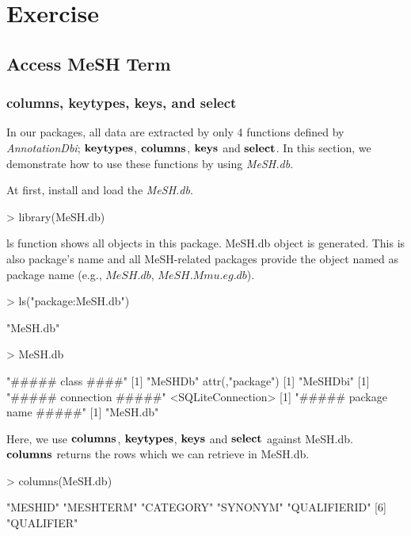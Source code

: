 \documentclass[11pt]{article}
\newcommand{\Rpackage}[1]{{\textit{#1}}}
\begin{document}
\section{Exercise}
\subsection{Access MeSH Term}
\subsubsection{columns, keytypes, keys, and select}
In our packages, all data are extracted by only 4 functions defined by \Rpackage{AnnotationDbi}; $\bf{keytypes}$, $\bf{columns}$, $\bf{keys}$ and $\bf{select}$. In this section, we demonstrate how to use these functions by using \Rpackage{MeSH.db}.

At first, install and load the \Rpackage{MeSH.db}.
\begin{center}
\begin{Schunk}
\begin{Sinput}
> library(MeSH.db)
\end{Sinput}
\end{Schunk}
\end{center}

ls function shows all objects in this package. MeSH.db object is generated. This is also package's name and all MeSH-related packages provide the object named as package name (e.g., $MeSH.db$, $MeSH.Mmu.eg.db$).
\begin{center}
\begin{Schunk}
\begin{Sinput}
> ls("package:MeSH.db")
\end{Sinput}
\begin{Soutput}
[1] "MeSH.db"
\end{Soutput}
\begin{Sinput}
> MeSH.db
\end{Sinput}
\begin{Soutput}
[1] "##### class ####"
[1] "MeSHDb"
attr(,"package")
[1] "MeSHDbi"
[1] "##### connection #####"
<SQLiteConnection>
[1] "##### package name #####"
[1] "MeSH.db"
\end{Soutput}
\end{Schunk}
\end{center}

Here, we use $\bf{columns}$, $\bf{keytypes}$, $\bf{keys}$ and $\bf{select}$ against MeSH.db.\\

$\bf{columns}$ returns the rows which we can retrieve in MeSH.db.
\begin{center}
\begin{Schunk}
\begin{Sinput}
> columns(MeSH.db)
\end{Sinput}
\begin{Soutput}
[1] "MESHID"      "MESHTERM"    "CATEGORY"    "SYNONYM"     "QUALIFIERID"
[6] "QUALIFIER"  
\end{Soutput}
\end{Schunk}
\end{center}
\end{document}
